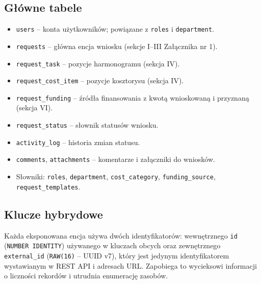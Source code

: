 \documentclass[12pt,a4paper]{article}
\begin{document}
\subsection{Główne tabele}
\begin{itemize}[leftmargin=*]
  \item \texttt{users} -- konta użytkowników; powiązane z \texttt{roles} i \texttt{department}.
  \item \texttt{requests} -- główna encja wniosku (sekcje I--III Załącznika nr 1).
  \item \texttt{request\_task} -- pozycje harmonogramu (sekcja IV).
  \item \texttt{request\_cost\_item} -- pozycje kosztorysu (sekcja IV).
  \item \texttt{request\_funding} -- źródła finansowania z kwotą wnioskowaną i przyznaną (sekcja VI).
  \item \texttt{request\_status} -- słownik statusów wniosku.
  \item \texttt{activity\_log} -- historia zmian statusu.
  \item \texttt{comments}, \texttt{attachments} -- komentarze i załączniki do wniosków.
  \item Słowniki: \texttt{roles}, \texttt{department}, \texttt{cost\_category},
        \texttt{funding\_source}, \texttt{request\_templates}.
\end{itemize}

\subsection{Klucze hybrydowe}
Każda eksponowana encja używa dwóch identyfikatorów:
wewnętrznego \texttt{id} (\texttt{NUMBER IDENTITY}) używanego w kluczach obcych
oraz zewnętrznego \texttt{external\_id} (\texttt{RAW(16)} -- UUID v7),
który jest jedynym identyfikatorem wystawianym w REST API i adresach URL.
Zapobiega to wycieksowi informacji o liczności rekordów i utrudnia enumerację zasobów.
\end{document}
